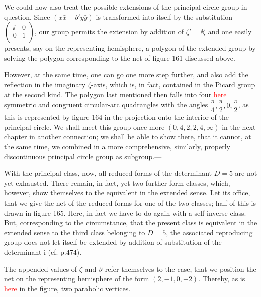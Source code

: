 We could now also treat the possible extensions of the principal-circle group in question. Since $(x\bar{x}-b'y\bar{y})$ is transformed into itself by the substitution $\left(\begin{array}{cc}
\ii & 0\\
0 & 1\\
\end{array}\right)$, our group permits the extension by addition of $\zeta'=\ii\zeta$ and one easily presents, say on the representing hemisphere, a polygon of the extended group by solving the polygon corresponding to the net of figure 161 discussed above.

However, at the same time, one can go one more step further, and also add the reflection in the imaginary $\zeta$-axis, which is, in fact, contained in the Picard group at the second kind. The polygon last mentioned then falls into four \textcolor{red}{here} symmetric and congruent circular-arc quadrangles with the angles $\dfrac{\pi}{4}, \dfrac{\pi}{2}, 0, \dfrac{\pi}{2}$, as this is represented by figure 164 in the projection onto the interior of the principal circle. We shall meet this group once more $(0,4,2,2,4,\infty)$ in the next chapter in another connection; we shall be able to show there, that it cannot, at the same time, we combined in a more comprehensive, similarly, properly discontinuous principal circle group as subgroup.---

With the principal class, now, all reduced forms of the determinant $D=5$ are not yet exhausted. There remain, in fact, yet two further form classes, which, however, show themselves to the equivalent in the extended sense. Let its office, that we give the net of the reduced forms for one of the two classes; half of this is drawn in figure 165. Here, in fact we have to do again with a self-inverse class. But, corresponding to the circumstance, that the present class is equivalent in the extended sense to the third class belonging to $D=5$, the associated reproducing group does not let itself be extended by addition of substitution of the determinant i (cf. p.474).

The appended values of $\zeta$ and $\vartheta$ refer themselves to the case, that we position the net on the representing hemisphere of the form $(2,-1,0,-2)$. Thereby, as is \textcolor{red}{here} in the figure, two parabolic vertices.

